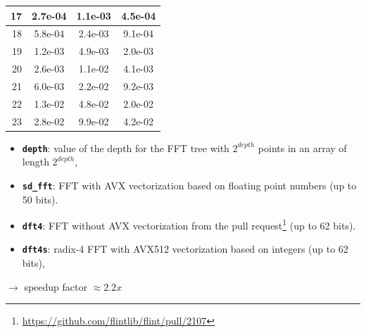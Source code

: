 \documentclass[10pt]{beamer}
\begin{document}
\begin{frame}
\begin{multicols}{2}
\begin{center}
{\begin{tabular}{|r|*{3}{c|}}
                \hline
                \cellcolor{myGray} 17 & 2.7e-04 & 1.1e-03 & 4.5e-04 \\
                \hline
                \cellcolor{myGray} 18 & 5.8e-04 & 2.4e-03 & 9.1e-04 \\
                \hline
                \cellcolor{myGray} 19 & 1.2e-03 & 4.9e-03 & 2.0e-03 \\
                \hline
                \cellcolor{myGray} 20 & 2.6e-03 & 1.1e-02 & 4.1e-03 \\
                \hline
                \cellcolor{myGray} 21 & 6.0e-03 & 2.2e-02 & 9.2e-03 \\
                \hline
                \cellcolor{myGray} 22 & 1.3e-02 & 4.8e-02 & 2.0e-02 \\
                \hline
                \cellcolor{myGray} 23 & 2.8e-02 & 9.9e-02 & 4.2e-02 \\
                \hline
            \end{tabular}
            }
        \end{center}
    \columnbreak

    \begin{itemize}
        \item \textbf{\texttt{depth}}: value of the depth for the FFT tree with $2^{depth}$ points
        in an array of length $2^{depth}$,
        \item \textbf{\texttt{sd\_fft}}: FFT with AVX vectorization based on floating point numbers (up to 50 bits).
        \item \textbf{\texttt{dft4}}: FFT without AVX vectorization from the pull request\footnote{\url{https://github.com/flintlib/flint/pull/2107}} (up to 62 bits).    
        \item \textbf{\texttt{dft4s}}: radix-4 FFT with AVX512 vectorization based on integers (up to 62 bits),
    \end{itemize}
    $\longrightarrow$ speedup factor $\approx 2.2x$
    \end{multicols}
\end{frame}
\end{document}
